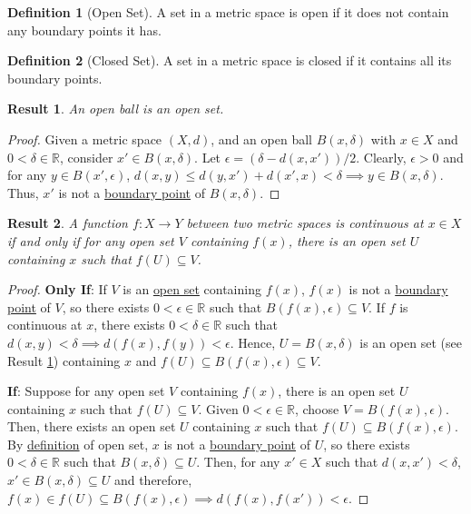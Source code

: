 \documentclass[letterpaper,12pt]{article}
\theoremstyle{plain}
\newtheorem{res}{Result}
\theoremstyle{plain}
\theoremstyle{definition}
\newtheorem{defn}{Definition}
\begin{document}
\begin{defn}[Open Set]\label{defoset}
A set in a metric space is open if it does not contain any boundary points it has.
\end{defn}

\begin{defn}[Closed Set]\label{defcset}
A set in a metric space is closed if it contains all its boundary points.
\end{defn}

\begin{res} An open ball is an open set.\label{resoball}
\end{res}
\begin{proof}
Given a metric space $(X,d)$, and an open ball $B(x,\delta)$ with $x\in X$ and $0<\delta\in \mathbb{R}$, consider $x'\in B(x,\delta)$. Let $\epsilon=\left(\delta-d(x,x')\right)/2$. Clearly, $\epsilon>0$ and for any $y\in B(x',\epsilon)$, $d(x,y)\le d(y,x')+d(x',x)<\delta \implies y\in B(x,\delta)$. Thus, $x'$ is not a \hyperref[defbpnt]{boundary point} of $B(x,\delta)$.
\end{proof}

\begin{res}\label{rescontx}
A function $f:X\rightarrow Y$ between two metric spaces is continuous at $x\in X$ if and only if for any open set $V$ containing $f(x)$, there is an open set $U$ containing $x$ such that $f(U)\subseteq V$.
\end{res}
\begin{proof}
\textbf{Only If}: If $V$ is an \hyperref[defoset]{open set} containing $f(x)$, $f(x)$ is not a \hyperref[defbpnt]{boundary point} of $V$, so there exists $0<\epsilon\in \mathbb{R}$ such that $B(f(x),\epsilon)\subseteq V$. If $f$ is continuous at $x$, there exists $0<\delta\in \mathbb{R}$ such that $d(x,y)<\delta\implies d(f(x),f(y))<\epsilon$. Hence, $U=B(x,\delta)$ is an open set (see Result \ref{resoball}) containing $x$ and $f(U)\subseteq B(f(x),\epsilon)\subseteq V$.

\noindent \textbf{If}: Suppose for any open set $V$ containing $f(x)$, there is an open set $U$ containing $x$ such that $f(U)\subseteq V$. Given $0<\epsilon\in \mathbb{R}$, choose $V=B(f(x),\epsilon)$.  Then, there exists an open set $U$ containing $x$ such that $f(U)\subseteq B(f(x),\epsilon)$. By \hyperref[defoset]{definition} of open set, $x$ is not a \hyperref[defbpnt]{boundary point} of $U$, so there exists $0<\delta\in \mathbb{R}$ such that $B(x,\delta)\subseteq U$. Then, for any $x'\in X$ such that $d(x,x')<\delta$, $x'\in B(x,\delta) \subseteq U$ and therefore, $f(x)\in f(U)\subseteq B(f(x),\epsilon)\implies d(f(x),f(x'))<\epsilon$.
\end{proof}
\end{document}
